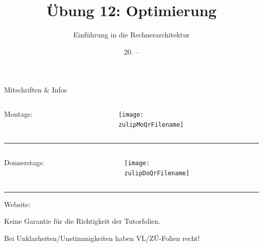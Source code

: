 \documentclass[
  german,            %
  aspectratio=169,    %
]{tumbeamer}
\title{Übung 12: Optimierung}
\subtitle{Einführung in die Rechnerarchitektur}
\author{\theAuthorName}
\institute{\theGroupName\\\theSchoolName\\\theUniversityName}
\date{20. -- \DTMdisplaydate{2025}{01}{26}{-1}}
\begin{document}
\maketitle

\begin{frame}[c]{Mitschriften \& Infos}{}
  \begin{minipage}[t]{\textwidth}
    \begin{columns}[c]
      \begin{column}{0.8\textwidth}
        Montags: \href{\zulipMo}{\zulipMo}
      \end{column}
      \begin{column}{0.2\textwidth}
        \texttt{[image: \\zulipMoQrFilename]}
      \end{column}
    \end{columns}
  \end{minipage}
  \rule{\textwidth}{0.4pt}
  \begin{minipage}[t]{\textwidth}
    \begin{columns}[c]
      \begin{column}{0.8\textwidth}
        Donnerstags: \href{\zulipDo}{\zulipDo}
      \end{column}
      \begin{column}{0.2\textwidth}
        \texttt{[image: \\zulipDoQrFilename]}
      \end{column}
    \end{columns}
  \end{minipage}
  \ifdefined\myWebsite
  \rule{\textwidth}{0.4pt}
  \centering
  Website: \href{\myWebsite}{\myWebsite}
  \fi
\end{frame}

\begin{frame}[c]{}{}
  \begin{center}
    \LARGE  Keine Garantie für die Richtigkeit der Tutorfolien.

    \Large Bei Unklarheiten/Unstimmigkeiten haben VL/ZÜ-Folien recht!
  \end{center}
\end{frame}
\end{document}
